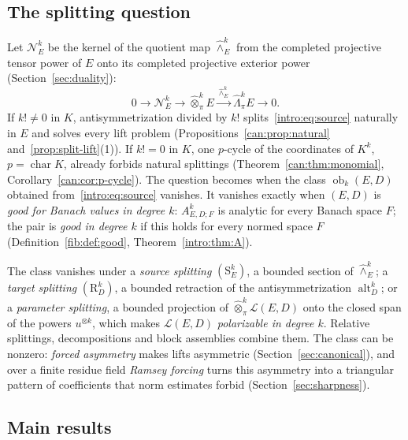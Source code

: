 \documentclass[11pt]{amsart}
\theoremstyle{definition}
\theoremstyle{remark}
\numberwithin{equation}{section}
\newcommand{\cL}{\mathcal L}
\theoremstyle{plain}
\theoremstyle{definition}
\theoremstyle{plain}
\newcommand{\alt}{\operatorname{alt}}
\newcommand{\ob}{\operatorname{ob}}
\newcommand{\cN}{\mathcal N}
\begin{document}
\subsection*{The splitting question}
Let $\cN^k_E$ be the kernel of the quotient map $\widehat\wedge^k_E$ from the completed projective tensor power of $E$
onto its completed projective exterior power (Section~\ref{sec:duality}):
\begin{equation}\label{intro:eq:source}
 0\longrightarrow\cN^k_E\longrightarrow\widehat\otimes^k_\pi E\xrightarrow{\ \widehat\wedge^k_E\ }
 \widehat\Lambda^k_\pi E\longrightarrow0.
\end{equation}
If $k!\ne0$ in $K$, antisymmetrization divided by $k!$ splits~\eqref{intro:eq:source} naturally in $E$ and solves every
lift problem (Propositions~\ref{can:prop:natural} and~\ref{prop:split-lift}(1)). If $k!=0$ in $K$, one $p$-cycle of
the coordinates of $K^k$, $p=\operatorname{char}K$, already forbids natural splittings (Theorem~\ref{can:thm:monomial},
Corollary~\ref{can:cor:p-cycle}). The question becomes when
the class $\ob_k(E,D)$ obtained from~\eqref{intro:eq:source} vanishes. It vanishes exactly when $(E,D)$ is \emph{good
for Banach values in degree $k$}: $A^k_{E,D;F}$ is analytic for every Banach space $F$; the pair is \emph{good in
degree $k$} if this holds for every normed space $F$ (Definition~\ref{fib:def:good}, Theorem~\ref{intro:thm:A}).

The class vanishes under a \emph{source splitting} $(\mathrm S^k_E)$, a bounded section of $\widehat\wedge^k_E$; a
\emph{target splitting} $(\mathrm R^k_D)$, a bounded retraction of the antisymmetrization $\alt^k_D$; or a
\emph{parameter splitting}, a bounded projection of $\widehat\otimes^k_\pi\cL(E,D)$ onto the closed span of the powers
$u^{\otimes k}$, which makes $\cL(E,D)$ \emph{polarizable in degree $k$}. Relative splittings, decompositions and
block assemblies combine them. The class can be nonzero: \emph{forced asymmetry} makes lifts asymmetric
(Section~\ref{sec:canonical}), and over a finite residue field \emph{Ramsey forcing} turns this asymmetry into a
triangular pattern of coefficients that norm estimates forbid (Section~\ref{sec:sharpness}).

\subsection*{Main results}
\end{document}
